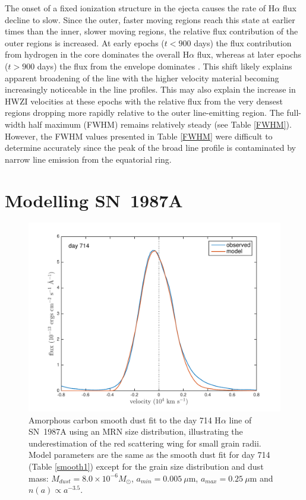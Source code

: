 The onset of a fixed ionization structure in the ejecta causes the rate of 
H$\alpha$ flux decline to slow.  Since the outer, faster moving regions 
reach this state at earlier times than the inner, slower moving regions, 
the relative flux contribution of the outer regions is increased.  At 
early epochs ($t<900$ days) the flux contribution from hydrogen in the 
core dominates the overall H$\alpha$ flux, whereas at later epochs ($t > 
900$ days) the flux from the envelope dominates \citep{Fransson1993, 
Kozma1998a}.  This shift likely explains apparent broadening of the line 
with the higher velocity material becoming increasingly noticeable in the 
line profiles.  This may also explain the increase in HWZI velocities at 
these epochs with the relative flux from the very densest regions dropping 
more rapidly relative to the outer line-emitting region. The full-width 
half maximum (FWHM) remains relatively steady (see Table 
\ref{FWHM}). However, the FWHM values presented in Table \ref{FWHM} were difficult 
to determine accurately since the peak of the broad line profile is 
contaminated by narrow line emission from the equatorial ring.


\section{Modelling SN~1987A}
\label{results}
\begin{figure}
\centering
\includegraphics[trim =33 10 45 15,clip=true,scale=0.7]{chapters/chapter5/images/smooth/d714Ha_smooth_amC_MRN.pdf}
\caption{Amorphous carbon smooth dust fit to the day 714 H$\alpha$ 
line of SN~1987A using an MRN size distribution,
illustrating the underestimation of the red scattering wing for small 
grain radii.  Model parameters are the same as the smooth dust fit for 
day 714 (Table \ref{smooth1}) except for the 
grain size distribution and dust mass:  $M_{dust}=8.0 \times 10^{-6} 
M_{\odot}$, $a_{min}=0.005~\mu$m, $a_{max}=0.25~\mu$m and $n(a) \propto 
a^{-3.5}$.}
\label{MRN}

\end{figure}




